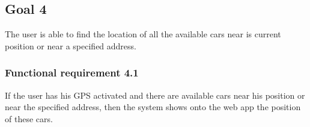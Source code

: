\subsection{Goal 4}
The user is able to find the location of all the available cars near is current position or near a specified address.

\setcounter{secnumdepth}{3}
\subsubsection{Functional requirement 4.1}
If the user has his GPS activated and there are available cars near his position or near the specified address, then the system shows onto the web app the position of these cars.
